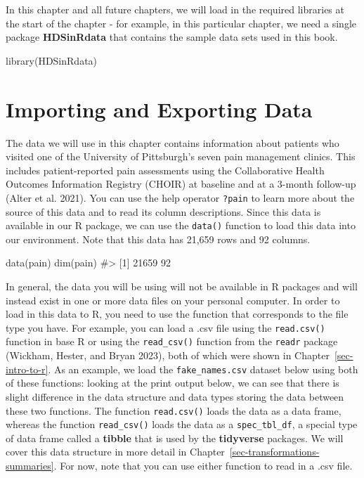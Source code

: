 \documentclass[
  letterpaper,
]{krantz}
\makeatletter
\newenvironment{Shaded}{\begin{snugshade}}{\end{snugshade}}
\newcommand{\CommentTok}[1]{\textcolor[rgb]{0.37,0.37,0.37}{#1}}
\newcommand{\FunctionTok}[1]{\textcolor[rgb]{0.28,0.35,0.67}{#1}}
\newcommand{\NormalTok}[1]{\textcolor[rgb]{0.00,0.23,0.31}{#1}}
\newenvironment{kframe}{%
\medskip{}
\setlength{\fboxsep}{.8em}
 \def\at@end@of@kframe{}%
 \ifinner\ifhmode%
  \def\at@end@of@kframe{\end{minipage}}%
  \begin{minipage}{\columnwidth}%
 \fi\fi%
 \def\FrameCommand##1{\hskip\@totalleftmargin \hskip-\fboxsep
 \colorbox{shadecolor}{##1}\hskip-\fboxsep
     \hskip-\linewidth \hskip-\@totalleftmargin \hskip\columnwidth}%
 \MakeFramed {\advance\hsize-\width
   \@totalleftmargin\z@ \linewidth\hsize
   \@setminipage}}%
 {\par\unskip\endMakeFramed%
 \at@end@of@kframe}
\renewenvironment{Shaded}{\begin{kframe}}{\end{kframe}}
\makeatother
\begin{document}
In this chapter and all future chapters, we will load in the required
libraries at the start of the chapter - for example, in this particular
chapter, we need a single package \textbf{HDSinRdata} that contains the
sample data sets used in this book.

\begin{Shaded}
\begin{Highlighting}[]
\FunctionTok{library}\NormalTok{(HDSinRdata)}
\end{Highlighting}
\end{Shaded}

\hypertarget{importing-and-exporting-data}{%
\section{Importing and Exporting
Data}\label{importing-and-exporting-data}}

The data we will use in this chapter contains information about patients
who visited one of the University of Pittsburgh's seven pain management
clinics. This includes patient-reported pain assessments using the
Collaborative Health Outcomes Information Registry (CHOIR) at baseline
and at a 3-month follow-up (Alter et al. 2021). You can use the help
operator \texttt{?pain} to learn more about the source of this data and
to read its column descriptions. Since this data is available in our R
package, we can use the \texttt{data()} function to load this data into
our environment. Note that this data has 21,659 rows and 92 columns.

\begin{Shaded}
\begin{Highlighting}[]
\FunctionTok{data}\NormalTok{(pain)}
\FunctionTok{dim}\NormalTok{(pain)}
\CommentTok{\#\textgreater{} [1] 21659    92}
\end{Highlighting}
\end{Shaded}

In general, the data you will be using will not be available in R
packages and will instead exist in one or more data files on your
personal computer. In order to load in this data to R, you need to use
the function that corresponds to the file type you have. For example,
you can load a .csv file using the \texttt{read.csv()} function in base
R or using the \texttt{read\_csv()} function from the \texttt{readr}
package (Wickham, Hester, and Bryan 2023), both of which were shown in
Chapter~\ref{sec-intro-to-r}. As an example, we load the
\texttt{fake\_names.csv} dataset below using both of these functions:
looking at the print output below, we can see that there is slight
difference in the data structure and data types storing the data between
these two functions. The function \texttt{read.csv()} loads the data as
a data frame, whereas the function \texttt{read\_csv()} loads the data
as a \texttt{spec\_tbl\_df}, a special type of data frame called a
\textbf{tibble} that is used by the \textbf{tidyverse} packages. We will
cover this data structure in more detail in
Chapter~\ref{sec-transformations-summaries}. For now, note that you can
use either function to read in a .csv file.
\end{document}
